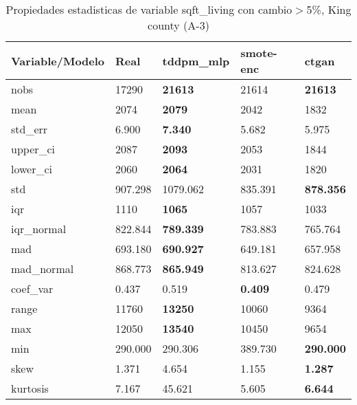 \begin{table}[H]
\centering
\fontsize{8}{14}\selectfont
\caption{Propiedades estadisticas de variable sqft\_living con cambio\ensuremath{>}5\%, King county (A-3)}
\label{table-stats-king county-a-3-sqft_living-short}
\begin{tabular}{|l|m{10em}|m{10em}|m{10em}|m{10em}|}
\hline
 \rowcolor[gray]{0.8}
Variable/Modelo & Real & tddpm\_mlp & smote-enc & ctgan \\
\hline nobs & 17290 & \bfseries 21613 & \cellcolor[rgb]{0.9, 0.54, 0.52} 21614 & \bfseries 21613 \\
\hline mean & 2074 & \bfseries 2079 & 2042 & \cellcolor[rgb]{0.9, 0.54, 0.52} 1832 \\
\hline std\_err & 6.900 & \bfseries 7.340 & \cellcolor[rgb]{0.9, 0.54, 0.52} 5.682 & 5.975 \\
\hline upper\_ci & 2087 & \bfseries 2093 & 2053 & \cellcolor[rgb]{0.9, 0.54, 0.52} 1844 \\
\hline lower\_ci & 2060 & \bfseries 2064 & 2031 & \cellcolor[rgb]{0.9, 0.54, 0.52} 1820 \\
\hline std & 907.298 & \cellcolor[rgb]{0.9, 0.54, 0.52} 1079.062 & 835.391 & \bfseries 878.356 \\
\hline iqr & 1110 & \bfseries 1065 & 1057 & \cellcolor[rgb]{0.9, 0.54, 0.52} 1033 \\
\hline iqr\_normal & 822.844 & \bfseries 789.339 & 783.883 & \cellcolor[rgb]{0.9, 0.54, 0.52} 765.764 \\
\hline mad & 693.180 & \bfseries 690.927 & \cellcolor[rgb]{0.9, 0.54, 0.52} 649.181 & 657.958 \\
\hline mad\_normal & 868.773 & \bfseries 865.949 & \cellcolor[rgb]{0.9, 0.54, 0.52} 813.627 & 824.628 \\
\hline coef\_var & 0.437 & \cellcolor[rgb]{0.9, 0.54, 0.52} 0.519 & \bfseries 0.409 & 0.479 \\
\hline range & 11760 & \bfseries 13250 & 10060 & \cellcolor[rgb]{0.9, 0.54, 0.52} 9364 \\
\hline max & 12050 & \bfseries 13540 & 10450 & \cellcolor[rgb]{0.9, 0.54, 0.52} 9654 \\
\hline min & 290.000 & 290.306 & \cellcolor[rgb]{0.9, 0.54, 0.52} 389.730 & \bfseries 290.000 \\
\hline skew & 1.371 & \cellcolor[rgb]{0.9, 0.54, 0.52} 4.654 & 1.155 & \bfseries 1.287 \\
\hline kurtosis & 7.167 & \cellcolor[rgb]{0.9, 0.54, 0.52} 45.621 & 5.605 & \bfseries 6.644 \\

\end{tabular}
\end{table}
